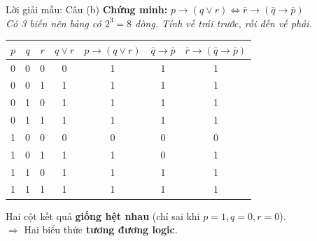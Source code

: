 \documentclass[12pt,a4paper]{article}
\begin{document}
\begin{baitap}{Lời giải mẫu: Câu (b)}
\textbf{Chứng minh:} $p \to (q \lor r) \Leftrightarrow \bar{r} \to (\bar{q} \to \bar{p})$\\
\textit{Có 3 biến nên bảng có $2^3 = 8$ dòng. Tính vế trái trước, rồi đến vế phải.}

\begin{center}
\renewcommand{\arraystretch}{1.2}
\begin{tabular}{|c|c|c||c|c||c|c|}
\hline
$p$ & $q$ & $r$ & $q \lor r$ & $p \to (q \lor r)$ & $\bar{q} \to \bar{p}$ & $\bar{r} \to (\bar{q} \to \bar{p})$ \\ \hline
0 & 0 & 0 & 0 & \textcolor{AccentRed}{1} & 1 & \textcolor{AccentRed}{1} \\ \hline
0 & 0 & 1 & 1 & \textcolor{AccentRed}{1} & 1 & \textcolor{AccentRed}{1} \\ \hline
0 & 1 & 0 & 1 & \textcolor{AccentRed}{1} & 1 & \textcolor{AccentRed}{1} \\ \hline
0 & 1 & 1 & 1 & \textcolor{AccentRed}{1} & 1 & \textcolor{AccentRed}{1} \\ \hline
1 & 0 & 0 & 0 & \textcolor{AccentRed}{0} & 0 & \textcolor{AccentRed}{0} \\ \hline
1 & 0 & 1 & 1 & \textcolor{AccentRed}{1} & 0 & \textcolor{AccentRed}{1} \\ \hline
1 & 1 & 0 & 1 & \textcolor{AccentRed}{1} & 1 & \textcolor{AccentRed}{1} \\ \hline
1 & 1 & 1 & 1 & \textcolor{AccentRed}{1} & 1 & \textcolor{AccentRed}{1} \\ \hline
\end{tabular}
\end{center}

Hai cột kết quả \textbf{giống hệt nhau} (chỉ sai khi $p = 1, q = 0, r = 0$).\\
$\Rightarrow$ Hai biểu thức \textbf{tương đương logic}.
\end{baitap}
\end{document}
